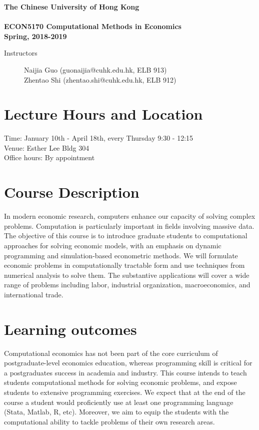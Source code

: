 \documentclass[11pt]{article}
\begin{document}
\begin{center}
  {\Large\bf The Chinese University of Hong Kong \\
  \ \\
ECON5170  Computational Methods in Economics \\
Spring, 2018-2019}
\end{center}

 \vspace{2pt}

\begin{description}
\item[Instructors] Naijia Guo (guonaijia@cuhk.edu.hk, ELB 913) \\
  Zhentao Shi (zhentao.shi@cuhk.edu.hk, ELB 912)
\end{description}

\section{Lecture Hours and Location}
Time: January 10th - April 18th, every Thursday 9:30 - 12:15 \\
Venue: Esther Lee Bldg 304 \\
Office hours: By appointment




\section{Course Description}

In modern economic research, computers enhance our capacity of solving complex problems. Computation is particularly important in fields involving massive data. The objective of this course is to introduce graduate students to computational approaches for solving economic models, with an emphasis on dynamic programming and simulation-based econometric methods. We will formulate economic problems in computationally tractable form and use techniques from numerical analysis to solve them. The substantive applications will cover a wide range of problems including labor, industrial organization, macroeconomics, and international trade.

\section{Learning outcomes}

Computational economics has not been part of the core curriculum of postgraduate-level economics education, whereas programming skill is critical for a postgraduates success in academia and industry. This course intends to teach students computational methods for solving economic problems, and expose students to extensive programming exercises. We expect that at the end of the course a student would proficiently use at least one programming language (Stata, Matlab, R, etc). Moreover, we aim to equip the students with the computational ability to tackle problems of their own research areas.
\end{document}
